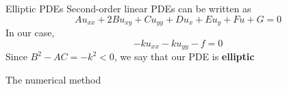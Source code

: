 \documentclass{beamer}
\begin{document}
    \begin{frame}{Elliptic PDEs}
        Second-order linear PDEs can be written as
        \begin{equation*}
            Au_{xx} + 2Bu_{xy} + Cu_{yy} + Du_x + Eu_y + Fu + G = 0
        \end{equation*}
        In our case,
        \begin{equation*}
            -ku_{xx} -ku_{yy} - f = 0
        \end{equation*}
        Since $B^2 - AC = -k^2 < 0$, we say that our PDE is \textbf{elliptic}
    \end{frame}

    \begin{frame}{The numerical method}
    \end{frame}
\end{document}

